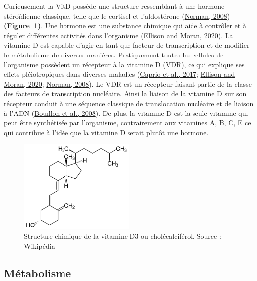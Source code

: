 \documentclass[
  letterpaper,
  DIV=11,
  numbers=noendperiod]{scrartcl}
\begin{document}
Curieusement la VitD possède une structure ressemblant à une hormone
stéroïdienne classique, telle que le cortisol et l'aldostérone
(\protect\hyperlink{ref-Norman.2008}{Norman, 2008})
\textbf{(Figure~\ref{fig-vitd3})}. Une hormone est une substance
chimique qui aide à contrôler et à réguler différentes activités dans
l'organisme (\protect\hyperlink{ref-Ellison.2020}{Ellison and Moran,
2020}). La vitamine D est capable d'agir en tant que facteur de
transcription et de modifier le métabolisme de diverses manières.
Pratiquement toutes les cellules de l'organisme possèdent un récepteur à
la vitamine D (VDR), ce qui explique ses effets pléiotropiques dans
diverses maladies (\protect\hyperlink{ref-Caprio.2017}{Caprio et al.,
2017}; \protect\hyperlink{ref-Ellison.2020}{Ellison and Moran, 2020};
\protect\hyperlink{ref-Norman.2008}{Norman, 2008}). Le VDR est un
récepteur faisant partie de la classe des facteurs de transcription
nucléaire. Ainsi la liaison de la vitamine D sur son récepteur conduit à
une séquence classique de translocation nucléaire et de liaison à l'ADN
(\protect\hyperlink{ref-Bouillon.2008}{Bouillon et al., 2008}). De plus,
la vitamine D est la seule vitamine qui peut être synthétisée par
l'organisme, contrairement aux vitamines A, B, C, E ce qui contribue à
l'idée que la vitamine D serait plutôt une hormone.

\begin{figure}

{\centering \includegraphics[width=0.5\textwidth,height=\textheight]{figures/vitamin-d3.png}

}

\caption{\label{fig-vitd3}Structure chimique de la vitamine D3 ou
cholécalciférol. Source : Wikipédia}

\end{figure}

\hypertarget{muxe9tabolisme}{%
\subsection{Métabolisme}\label{muxe9tabolisme}}
\end{document}
